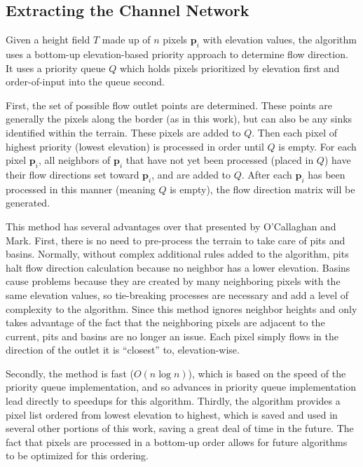 \subsection{Extracting the Channel Network}

Given a height field $T$ made up of $n$ pixels $\textbf{p}_i$ with elevation values, the algorithm uses a bottom-up elevation-based priority approach to determine flow direction. It uses a priority queue $Q$ which holds pixels prioritized by elevation first and order-of-input into the queue second. 

First, the set of possible flow outlet points are determined. These points are generally the pixels along the border (as in this work), but can also be any sinks identified within the terrain. These pixels are added to $Q$. Then each pixel of highest priority (lowest elevation) is processed in order until $Q$ is empty. For each pixel $\textbf{p}_i$, all neighbors of $\textbf{p}_i$ that have not yet been processed (placed in $Q$) have their flow directions set toward $\textbf{p}_i$, and are added to $Q$. After each $\textbf{p}_i$ has been processed in this manner (meaning $Q$ is empty), the flow direction matrix will be generated.


This method has several advantages over that presented by O'Callaghan and Mark. First, there is no need to pre-process the terrain to take care of pits and basins. 
Normally, without complex additional rules added to the algorithm, pits halt flow direction calculation because no neighbor has a lower elevation. 
Basins cause problems because they are created by many neighboring pixels with the same elevation values, so tie-breaking processes are necessary and add a level of complexity to the algorithm.
Since this method ignores neighbor heights and only takes advantage of the fact that the neighboring pixels are adjacent to the current, pits and basins are no longer an issue. Each pixel simply flows in the direction of the outlet it is ``closest'' to, elevation-wise. 

Secondly, the method is fast ($O\left(n \log{n}\right)$), which is based on the speed of the priority queue implementation, and so advances in priority queue implementation lead directly to speedups for this algorithm. Thirdly, the algorithm provides a pixel list ordered from lowest elevation to highest, which is saved and used in several other portions of this work, saving a great deal of time in the future. The fact that pixels are processed in a bottom-up order allows for future algorithms to be optimized for this ordering. 

